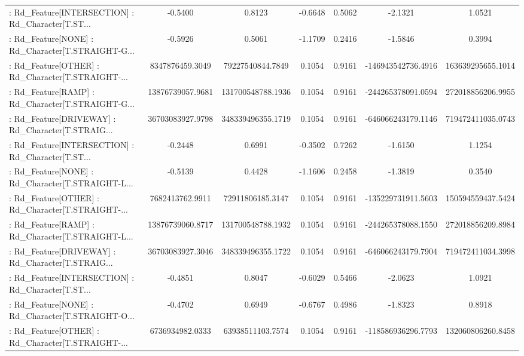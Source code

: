 \begin{longtable}{p{4cm}cccccc}
 : Rd\_Feature[INTERSECTION] : Rd\_Character[T.ST... &           -0.5400 &            0.8123 & -0.6648 &       0.5062 &            -2.1321 &            1.0521 \\
 : Rd\_Feature[NONE] : Rd\_Character[T.STRAIGHT-G... &           -0.5926 &            0.5061 & -1.1709 &       0.2416 &            -1.5846 &            0.3994 \\
 : Rd\_Feature[OTHER] : Rd\_Character[T.STRAIGHT-... &   8347876459.3049 &  79227540844.7849 &  0.1054 &       0.9161 & -146943542736.4916 & 163639295655.1014 \\
 : Rd\_Feature[RAMP] : Rd\_Character[T.STRAIGHT-G... &  13876739057.9681 & 131700548788.1936 &  0.1054 &       0.9161 & -244265378091.0594 & 272018856206.9955 \\
 : Rd\_Feature[DRIVEWAY] : Rd\_Character[T.STRAIG... &  36703083927.9798 & 348339496355.1719 &  0.1054 &       0.9161 & -646066243179.1146 & 719472411035.0743 \\
 : Rd\_Feature[INTERSECTION] : Rd\_Character[T.ST... &           -0.2448 &            0.6991 & -0.3502 &       0.7262 &            -1.6150 &            1.1254 \\
 : Rd\_Feature[NONE] : Rd\_Character[T.STRAIGHT-L... &           -0.5139 &            0.4428 & -1.1606 &       0.2458 &            -1.3819 &            0.3540 \\
 : Rd\_Feature[OTHER] : Rd\_Character[T.STRAIGHT-... &   7682413762.9911 &  72911806185.3147 &  0.1054 &       0.9161 & -135229731911.5603 & 150594559437.5424 \\
 : Rd\_Feature[RAMP] : Rd\_Character[T.STRAIGHT-L... &  13876739060.8717 & 131700548788.1932 &  0.1054 &       0.9161 & -244265378088.1550 & 272018856209.8984 \\
 : Rd\_Feature[DRIVEWAY] : Rd\_Character[T.STRAIG... &  36703083927.3046 & 348339496355.1722 &  0.1054 &       0.9161 & -646066243179.7904 & 719472411034.3998 \\
 : Rd\_Feature[INTERSECTION] : Rd\_Character[T.ST... &           -0.4851 &            0.8047 & -0.6029 &       0.5466 &            -2.0623 &            1.0921 \\
 : Rd\_Feature[NONE] : Rd\_Character[T.STRAIGHT-O... &           -0.4702 &            0.6949 & -0.6767 &       0.4986 &            -1.8323 &            0.8918 \\
 : Rd\_Feature[OTHER] : Rd\_Character[T.STRAIGHT-... &   6736934982.0333 &  63938511103.7574 &  0.1054 &       0.9161 & -118586936296.7793 & 132060806260.8458 \\

\end{longtable}
